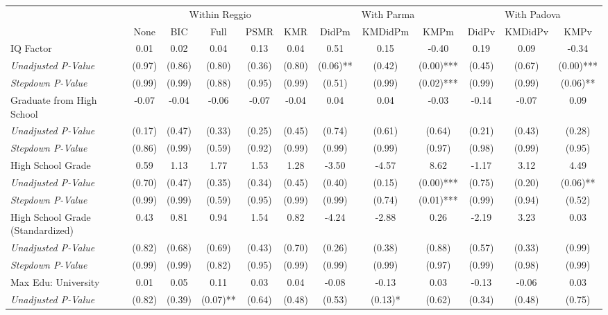 \begin{tabular}{l c c c c c c c c c c c}
\toprule
& \multicolumn{5}{c}{Within Reggio} & \multicolumn{3}{c}{With Parma} & \multicolumn{3}{c}{With Padova} \\\cmidrule(lr){2-6} \cmidrule(lr){7-9} \cmidrule(lr){10-12}
 & None & BIC & Full & PSMR & KMR & DidPm & KMDidPm & KMPm & DidPv & KMDidPv & KMPv \\
\midrule
IQ Factor & 0.01 & 0.02 & 0.04 & 0.13 & 0.04 & 0.51 & 0.15 & -0.40 & 0.19 & 0.09 & -0.34 \\
\quad \textit{Unadjusted P-Value} & (0.97) & (0.86) & (0.80) & (0.36) & (0.80) & (0.06)** & (0.42) & (0.00)*** & (0.45) & (0.67) & (0.00)*** \\
\quad \textit{Stepdown P-Value} & (0.99) & (0.99) & (0.88) & (0.95) & (0.99) & (0.51) & (0.99) & (0.02)*** & (0.99) & (0.99) & (0.06)** \\
Graduate from High School & -0.07 & -0.04 & -0.06 & -0.07 & -0.04 & 0.04 & 0.04 & -0.03 & -0.14 & -0.07 & 0.09 \\
\quad \textit{Unadjusted P-Value} & (0.17) & (0.47) & (0.33) & (0.25) & (0.45) & (0.74) & (0.61) & (0.64) & (0.21) & (0.43) & (0.28) \\
\quad \textit{Stepdown P-Value} & (0.86) & (0.99) & (0.59) & (0.92) & (0.99) & (0.99) & (0.99) & (0.97) & (0.98) & (0.99) & (0.95) \\
High School Grade & 0.59 & 1.13 & 1.77 & 1.53 & 1.28 & -3.50 & -4.57 & 8.62 & -1.17 & 3.12 & 4.49 \\
\quad \textit{Unadjusted P-Value} & (0.70) & (0.47) & (0.35) & (0.34) & (0.45) & (0.40) & (0.15) & (0.00)*** & (0.75) & (0.20) & (0.06)** \\
\quad \textit{Stepdown P-Value} & (0.99) & (0.99) & (0.59) & (0.95) & (0.99) & (0.99) & (0.74) & (0.01)*** & (0.99) & (0.94) & (0.52) \\
High School Grade (Standardized) & 0.43 & 0.81 & 0.94 & 1.54 & 0.82 & -4.24 & -2.88 & 0.26 & -2.19 & 3.23 & 0.03 \\
\quad \textit{Unadjusted P-Value} & (0.82) & (0.68) & (0.69) & (0.43) & (0.70) & (0.26) & (0.38) & (0.88) & (0.57) & (0.33) & (0.99) \\
\quad \textit{Stepdown P-Value} & (0.99) & (0.99) & (0.82) & (0.95) & (0.99) & (0.99) & (0.99) & (0.97) & (0.99) & (0.98) & (0.99) \\
Max Edu: University & 0.01 & 0.05 & 0.11 & 0.03 & 0.04 & -0.08 & -0.13 & 0.03 & -0.13 & -0.06 & 0.03 \\
\quad \textit{Unadjusted P-Value} & (0.82) & (0.39) & (0.07)** & (0.64) & (0.48) & (0.53) & (0.13)* & (0.62) & (0.34) & (0.48) & (0.75) \\

\end{tabular}
